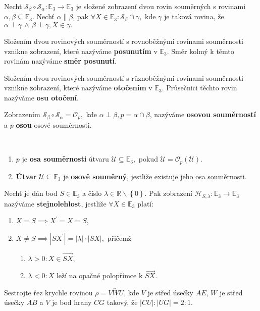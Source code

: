 \begin{veta}
    Nechť $\mathscr S_\beta \circ \mathscr S_\alpha: \mathbb E_3 \to \mathbb E_3$ je
    složené zobrazení dvou rovin souměrných s rovinami $\alpha, \beta\subseteq \mathbb
    E_3$. Nechť $\alpha \parallel \beta$, pak $\forall X\in \mathbb E_3: \mathscr
    S_\beta \cap \gamma,$ kde $\gamma$ je taková rovina, že $\alpha \perp \gamma \, \land\,
    \beta \perp \gamma, X \in \gamma.$
\end{veta}

\begin{definition}
    Složením dvou rovinových souměrností s rovnoběžnými rovinami souměrnosti vznikne
    zobrazení, které nazýváme \textbf{posunutím} v $\mathbb E_3.$ Směr kolmý k těmto
    rovinám nazýváme \textbf{směr posunutí}.
\end{definition}

\begin{definition}
    Složením dvou rovinových souměrností s různoběžnými rovinami souměrnosti vznikne
    zobrazení, které nazýváme \textbf{otočením} v $\mathbb E_3.$ Průsečnici těchto
    rovin nazýváme \textbf{osu otočení}.
\end{definition}

\begin{definition}
    Zobrazením $\mathscr S_\beta \circ \mathscr S_\alpha = \mathscr O_p,$ kde
    $\alpha \perp \beta, p=\alpha \cap \beta$, nazýváme \textbf{osovou souměrností}
    a $p$ \textbf{osou} osové souměrnosti.
\end{definition}

\begin{definition}\,
\begin{enumerate}[$i.$]
\item $p$ je \textbf{osa souměrnosti} útvaru $\mathscr U\subseteq \mathbb E_3,$
pokud $\mathscr U = \mathscr O_p(\mathscr U).$
\item \textbf{Útvar} $\mathscr U \subseteq \mathbb E_3$ je \textbf{osově souměrný},
jestliže existuje jeho osa souměrnosti.
\end{enumerate}
\end{definition}

\begin{definition}
    Nechť je dán bod $S\in \mathbb E_3$ a číslo $\lambda \in \mathbb R \smallsetminus \left \{ 0
    \right \}. $ Pak zobrazení $\mathscr H_{S,\lambda}: \mathbb E_3 \to \mathbb E_3$
   nazýváme \textbf{stejnolehlost}, jestliže $\forall X \in \mathbb E_3$ platí:
   \begin{enumerate}[$i.$]
   \item $X=S\implies X^\prime =X=S$,
  	\item $X\ne S\implies |SX^\prime| = |\lambda|\cdot |SX|,$ přičemž
   \begin{enumerate}[$a.$]
   \item $\lambda > 0: X\in \overrightarrow{SX},$
  	\item $\lambda < 0: X$ leží na opačné polopřímce k $\overrightarrow{SX}.$
   \end{enumerate}
   \end{enumerate}
\end{definition}

\begin{priklad}
Sestrojte řez krychle rovinou $\rho=\overleftrightarrow{VWU}$, kde $V$ je střed
úsečky $AE$, $W$ je střed úsečky $AB$ a $V$ je bod hrany $CG$ takový, že $|CU|:|UG|=2:1$.
\end{priklad}
